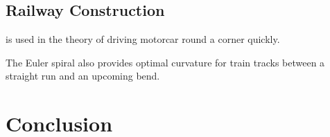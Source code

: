 \documentclass[12pt]{article}
\begin{document}
\FloatBarrier 
\subsection{Railway  Construction}

 is used in the theory of driving motorcar round a corner quickly.
 
 The Euler spiral also provides optimal curvature for train tracks between a straight run and an upcoming bend. 
 

\section{Conclusion}





\nocite{AS, BE, Sim, Str, WW}  %
\end{document}
